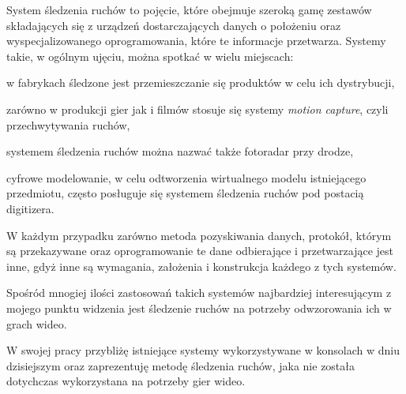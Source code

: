 \label{ch:wstep}

System śledzenia ruchów to pojęcie, które obejmuje szeroką gamę zestawów składających się z urządzeń dostarczających danych o położeniu oraz wyspecjalizowanego oprogramowania, które te informacje przetwarza. Systemy takie, w ogólnym ujęciu, można spotkać w wielu miejscach:
\begin{aenumerate}
  \item w fabrykach śledzone jest przemieszczanie się produktów w celu ich dystrybucji,
  \item zarówno w produkcji gier jak i filmów stosuje się systemy \textsl{motion capture}, czyli przechwytywania ruchów,
  \item systemem śledzenia ruchów można nazwać także fotoradar przy drodze,
  \item cyfrowe modelowanie, w celu odtworzenia wirtualnego modelu istniejącego przedmiotu, często posługuje się systemem śledzenia ruchów pod postacią digitizera.
\end{aenumerate}

W każdym przypadku zarówno metoda pozyskiwania danych, protokół, którym są przekazywane oraz oprogramowanie te dane odbierające i przetwarzające jest inne, gdyż inne są wymagania, założenia i konstrukcja każdego z tych systemów.

Spośród mnogiej ilości zastosowań takich systemów najbardziej interesującym z mojego punktu widzenia jest śledzenie ruchów na potrzeby odwzorowania ich w grach wideo.

W swojej pracy przybliżę istniejące systemy wykorzystywane w konsolach w dniu dzisiejszym oraz zaprezentuję metodę śledzenia ruchów, jaka nie została dotychczas wykorzystana na potrzeby gier wideo.


